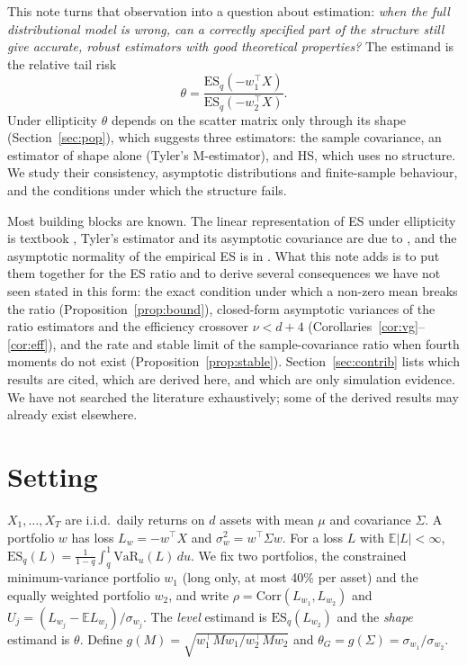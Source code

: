 \documentclass[11pt]{article}
\newcommand{\E}{\mathbb{E}}
\newcommand{\ES}{\mathrm{ES}}
\theoremstyle{remark}
\begin{document}
This note turns that observation into a question about estimation: \emph{when the full distributional model
is wrong, can a correctly specified part of the structure still give accurate, robust estimators with good
theoretical properties?} The estimand is the relative tail risk
\[
\theta=\frac{\ES_q(-w_1^\top X)}{\ES_q(-w_2^\top X)} .
\]
Under ellipticity $\theta$ depends on the scatter matrix only through its shape (Section~\ref{sec:pop}), which
suggests three estimators: the sample covariance, an estimator of shape alone (Tyler's M-estimator), and HS,
which uses no structure. We study their consistency, asymptotic distributions and finite-sample behaviour,
and the conditions under which the structure fails.

Most building blocks are known. The linear representation of ES under ellipticity is textbook
\citep{mcneil2015}, Tyler's estimator and its asymptotic covariance are due to \citet{tyler1987}, and the
asymptotic normality of the empirical ES is in \citet{chen2008}. What this note adds is to put them together
for the ES ratio and to derive several consequences we have not seen stated in this form: the exact condition
under which a non-zero mean breaks the ratio (Proposition~\ref{prop:bound}), closed-form asymptotic variances
of the ratio estimators and the efficiency crossover $\nu<d+4$ (Corollaries~\ref{cor:vg}--\ref{cor:eff}), and
the rate and stable limit of the sample-covariance ratio when fourth moments do not exist
(Proposition~\ref{prop:stable}). Section~\ref{sec:contrib} lists which results are cited, which are derived
here, and which are only simulation evidence. We have not searched the literature exhaustively; some of the
derived results may already exist elsewhere.

\section{Setting}\label{sec:setting}

$X_1,\dots,X_T$ are i.i.d.\ daily returns on $d$ assets with mean $\mu$ and covariance $\Sigma$. A portfolio
$w$ has loss $L_w=-w^\top X$ and $\sigma_w^2=w^\top\Sigma w$. For a loss $L$ with $\E|L|<\infty$,
$\ES_q(L)=\frac1{1-q}\int_q^1\mathrm{VaR}_u(L)\,du$. We fix two portfolios, the constrained minimum-variance
portfolio $w_1$ (long only, at most 40\% per asset) and the equally weighted portfolio $w_2$, and write
$\rho=\mathrm{Corr}(L_{w_1},L_{w_2})$ and $U_j=(L_{w_j}-\E L_{w_j})/\sigma_{w_j}$. The \emph{level}
estimand is $\ES_q(L_{w_2})$ and the \emph{shape} estimand is $\theta$. Define
$g(M)=\sqrt{w_1^\top Mw_1/w_2^\top Mw_2}$ and $\theta_G=g(\Sigma)=\sigma_{w_1}/\sigma_{w_2}$.
\end{document}
